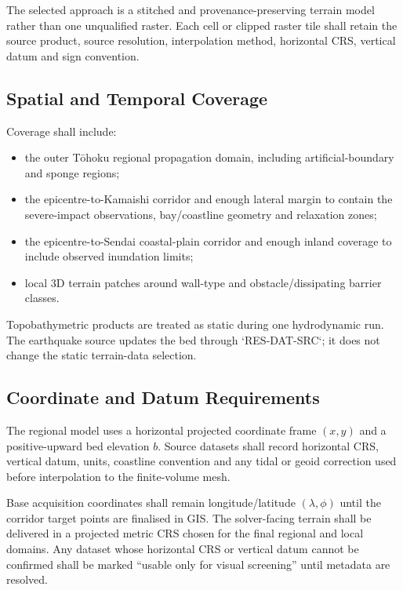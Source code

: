 The selected approach is a stitched and provenance-preserving terrain
model rather than one unqualified raster. Each cell or clipped raster
tile shall retain the source product, source resolution, interpolation
method, horizontal CRS, vertical datum and sign convention.

\subsection{Spatial and Temporal Coverage}
\label{sec:res-dat-geo-spatial-temporal-coverage}

Coverage shall include:

\begin{itemize}
  \item the outer Tōhoku regional propagation domain, including
    artificial-boundary and sponge regions;
  \item the epicentre-to-Kamaishi corridor and enough lateral margin to
    contain the severe-impact observations, bay/coastline geometry and
    relaxation zones;
  \item the epicentre-to-Sendai coastal-plain corridor and enough
    inland coverage to include observed inundation limits;
  \item local 3D terrain patches around wall-type and
    obstacle/dissipating barrier classes.
\end{itemize}

Topobathymetric products are treated as static during one hydrodynamic
run. The earthquake source updates the bed through `RES-DAT-SRC`; it
does not change the static terrain-data selection.

\subsection{Coordinate and Datum Requirements}
\label{sec:res-dat-geo-coordinate-datum-requirements}

The regional model uses a horizontal projected coordinate frame
$(x,y)$ and a positive-upward bed elevation $b$. Source datasets shall
record horizontal CRS, vertical datum, units, coastline convention and
any tidal or geoid correction used before interpolation to the
finite-volume mesh.

Base acquisition coordinates shall remain longitude/latitude
$(\lambda,\phi)$ until the corridor target points are finalised in GIS.
The solver-facing terrain shall be delivered in a projected metric CRS
chosen for the final regional and local domains. Any dataset whose
horizontal CRS or vertical datum cannot be confirmed shall be marked
``usable only for visual screening'' until metadata are resolved.

